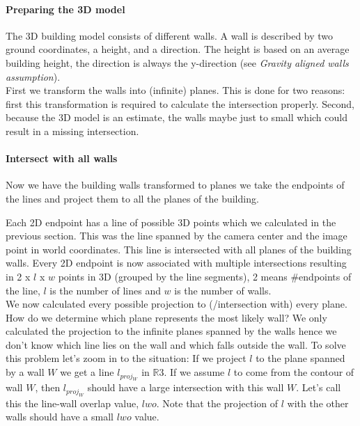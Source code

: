 	\paragraph{Preparing the 3D model}
	The 3D building model consists of different walls. A wall is described by
	two ground coordinates, a height, and a direction.
	The height is based on an average building height, the direction is always the
	y-direction (see \emph{Gravity aligned walls assumption}).\\
	First we transform the walls into (infinite) planes.  This is done for two
	reasons: first this transformation is required to calculate the intersection
	properly. Second, because the 3D model is an estimate, the walls maybe just
	to small which could result in a missing intersection. \\


	\paragraph{Intersect with all walls}
	Now we have the building walls transformed to planes we take the endpoints of the
	lines and project them to all the planes of the building.  

	Each 2D endpoint has a line of possible 3D points which we calculated in the
	previous section. This was the line spanned by the camera center and the
	image point in world coordinates.
	This line is intersected with all planes of the building walls. Every 2D
	endpoint is now associated with multiple intersections resulting in 2 x
	$l$ x $w$ points in 3D (grouped by the line segments), 2 means
	\#endpoints of the line, $l$ is the number of lines and $w$ is the number of
	walls.\\

	We now calculated every possible projection to (/intersection with) every plane. How do we
	determine which plane represents the most likely wall?  
	We only calculated the projection to the
	infinite planes spanned by the walls hence we don't know which line lies on
	the wall and which falls outside the wall. To solve this problem let's
	zoom in to the situation:
	If we project $l$ to the plane spanned
	by a wall $W$ we get a line $l_{proj_W}$ in $\mathbb{R}3$.  If we assume
	$l$ to come from the contour of wall $W$, then $l_{proj_W}$ should have a large
	intersection with this wall $W$. 
	Let's call this the line-wall overlap value, $lwo$.  
	Note that the projection of $l$ with the
	other walls should have a small $lwo$ value.\\

